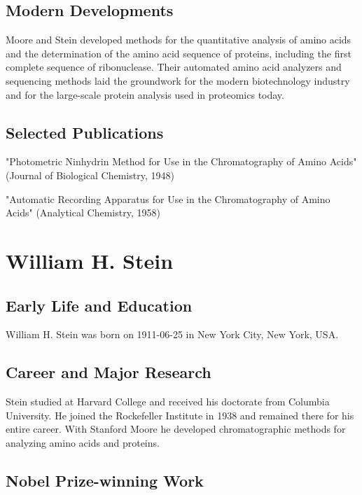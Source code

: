 \subsection*{Modern Developments}

Moore and Stein developed methods for the quantitative analysis of amino acids and the determination of the amino acid sequence of proteins, including the first complete sequence of ribonuclease. Their automated amino acid analyzers and sequencing methods laid the groundwork for the modern biotechnology industry and for the large-scale protein analysis used in proteomics today.

\subsection*{Selected Publications}

"Photometric Ninhydrin Method for Use in the Chromatography of Amino Acids" (Journal of Biological Chemistry, 1948)

"Automatic Recording Apparatus for Use in the Chromatography of Amino Acids" (Analytical Chemistry, 1958)

\clearpage

\section{William H. Stein}

\subsection*{Early Life and Education}

William H. Stein was born on 1911-06-25 in New York City, New York, USA.

\subsection*{Career and Major Research}

Stein studied at Harvard College and received his doctorate from Columbia University. He joined the Rockefeller Institute in 1938 and remained there for his entire career. With Stanford Moore he developed chromatographic methods for analyzing amino acids and proteins.

\subsection*{Nobel Prize-winning Work}

